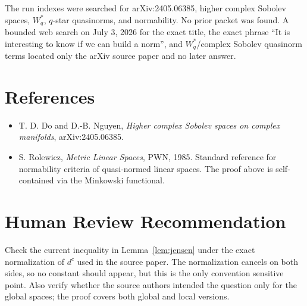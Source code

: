 \documentclass[11pt]{article}
\begin{document}
The run indexes were searched for arXiv:2405.06385, higher complex Sobolev
spaces, \(W_q^*\), \(q\)-star quasinorms, and normability. No prior packet was
found. A bounded web search on July 3, 2026 for the exact title, the exact
phrase ``It is interesting to know if we can build a norm'', and
\(W_q^*\)/complex Sobolev quasinorm terms located only the arXiv source paper
and no later answer.

\section*{References}

\begin{itemize}
\item T. D. Do and D.-B. Nguyen, \emph{Higher complex Sobolev spaces on
complex manifolds}, arXiv:2405.06385.
\item S. Rolewicz, \emph{Metric Linear Spaces}, PWN, 1985. Standard reference
for normability criteria of quasi-normed linear spaces. The proof above is
self-contained via the Minkowski functional.
\end{itemize}

\section*{Human Review Recommendation}

Check the current inequality in Lemma~\ref{lem:jensen} under the exact
normalization of \(d^c\) used in the source paper. The normalization cancels
on both sides, so no constant should appear, but this is the only convention
sensitive point. Also verify whether the source authors intended the question
only for the global spaces; the proof covers both global and local versions.
\end{document}
